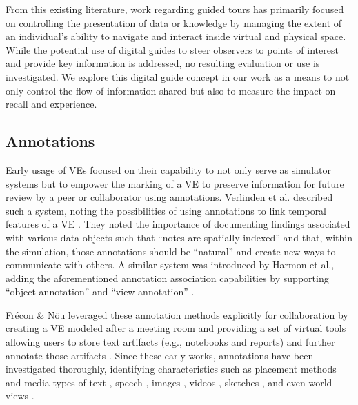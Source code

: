 \noindent From this existing literature, work regarding guided tours has primarily focused on controlling the presentation of data or knowledge by managing the extent of an individual's ability to navigate and interact inside virtual and physical space. 
While the potential use of digital guides to steer observers to points of interest and provide key information is addressed, no resulting evaluation or use is investigated.
We explore this digital guide concept in our work as a means to not only control the flow of information shared but also to measure the impact on recall and experience.


\subsection{Annotations}
Early usage of VEs focused on their capability to not only serve as simulator systems but to empower the marking of a VE to preserve information for future review by a peer or collaborator using annotations.
Verlinden et al. described such a system, noting the possibilities of using annotations to link temporal features of a VE \cite{Verlinden_VirtualAnnotation1993}.
They noted the importance of documenting findings associated with various data objects such that ``notes are spatially indexed'' and that, within the simulation, those annotations should be ``natural'' and create new ways to communicate with others.
A similar system was introduced by Harmon et al., adding the aforementioned annotation association capabilities by supporting ``object annotation'' and ``view annotation'' \cite{Harmon_AnnotationSys1996}. 

Frécon \& Nöu leveraged these annotation methods explicitly for collaboration by creating a VE modeled after a meeting room and providing a set of virtual tools allowing users to store text artifacts (e.g., notebooks and reports) and further annotate those artifacts \cite{Frecon_BuildingDistVEs1998}.
Since these early works, annotations have been investigated thoroughly, identifying characteristics such as placement methods \cite{Bowman_IRVE2003, Wither_OutdoorAR2009, Pick_PosAnnotation2010} and media types of text \cite{Lisle_ISTSense2021, Tahmid_ColtCollab2023}, speech \cite{Verlinden_VirtualAnnotation1993, Ribarsky_VRSpeech1994}, images \cite{Tahmid_ISTClusters2022}, videos \cite{Hansen_UbiAnnotation2006}, sketches \cite{Guerreiro_BeyondPostIt2014, Clergeaud_AnnotationSys2017}, and even world-views \cite{Bell_ViewMgmt2001}.\\

